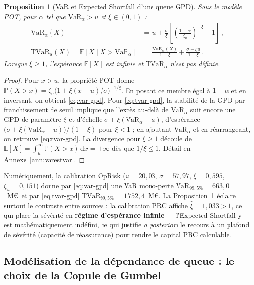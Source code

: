 \documentclass[11pt,a4paper]{article}
\theoremstyle{navystyle}
\newtheorem{proposition}[theorem]{Proposition}
\theoremstyle{navydef}
\newcommand{\E}{\mathbb{E}}
\newcommand{\Prob}{\mathbb{P}}
\newcommand{\VaR}{\mathrm{VaR}}
\newcommand{\TVaR}{\mathrm{TVaR}}
\newcommand{\dd}{\mathrm{d}}
\begin{document}
\begin{proposition}[VaR et Expected Shortfall d'une queue GPD]\label{prop:varestvar}
Sous le modèle POT, pour $\alpha$ tel que $\mathrm{VaR}_\alpha>u$ et $\xi\in(0,1)$ :
\begin{align}
\VaR_\alpha(X) &= \boxed{\,u + \frac{\sigma}{\xi}\left[\left(\frac{1-\alpha}{\zeta_u}\right)^{-\xi}-1\right]\,},\label{eq:var-gpd}\\[4pt]
\TVaR_\alpha(X) = \E[X\mid X>\VaR_\alpha] &= \boxed{\,\frac{\VaR_\alpha(X)}{1-\xi}+\frac{\sigma-\xi u}{1-\xi}\,}.\label{eq:tvar-gpd}
\end{align}
Lorsque $\xi\ge 1$, l'espérance $\E[X]$ est infinie et $\TVaR_\alpha$ n'est pas définie.
\end{proposition}

\begin{proof}
Pour $x>u$, la propriété POT donne $\Prob(X>x)=\zeta_u\bigl(1+\xi(x-u)/\sigma\bigr)^{-1/\xi}$. En posant ce membre égal à $1-\alpha$ et en inversant, on obtient \eqref{eq:var-gpd}. Pour \eqref{eq:tvar-gpd}, la stabilité de la GPD par franchissement de seuil implique que l'excès au-delà de $\VaR_\alpha$ suit encore une GPD de paramètre $\xi$ et d'échelle $\sigma+\xi(\VaR_\alpha-u)$, d'espérance $\bigl(\sigma+\xi(\VaR_\alpha-u)\bigr)/(1-\xi)$ pour $\xi<1$ ; en ajoutant $\VaR_\alpha$ et en réarrangeant, on retrouve \eqref{eq:tvar-gpd}. La divergence pour $\xi\ge1$ découle de $\E[X]=\int_u^\infty \Prob(X>x)\,\dd x=+\infty$ dès que $1/\xi\le1$. Détail en Annexe~\ref{ann:varestvar}.
\end{proof}

\noindent Numériquement, la calibration OpRisk ($u=20{,}03$, $\sigma=57{,}97$, $\xi=0{,}595$, $\zeta_u=0{,}151$) donne par \eqref{eq:var-gpd} une VaR mono-perte $\VaR_{99{,}5\%}=663{,}0$~M\euro\ et par \eqref{eq:tvar-gpd} $\TVaR_{99{,}5\%}=1\,752{,}4$~M\euro. La Proposition~\ref{prop:varestvar} éclaire surtout le contraste entre sources : la calibration PRC affiche $\hat\xi=1{,}033>1$, ce qui place la sévérité en \textbf{régime d'espérance infinie} --- l'Expected Shortfall y est mathématiquement indéfini, ce qui justifie \emph{a posteriori} le recours à un plafond de sévérité (capacité de réassurance) pour rendre le capital PRC calculable.

\subsection{Modélisation de la dépendance de queue : le choix de la Copule de Gumbel}
\end{document}
